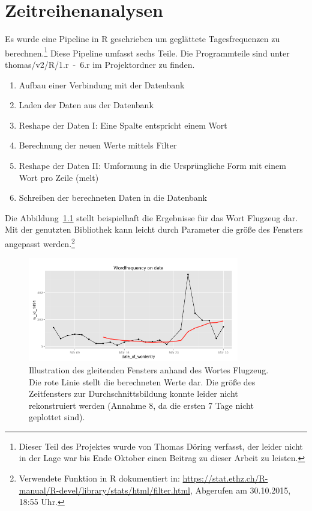 \chapter{Zeitreihenanalysen}
Es wurde eine Pipeline in R geschrieben um geglättete Tagesfrequenzen zu berechnen.\footnote{Dieser Teil des Projektes wurde von Thomas Döring verfasst, der leider nicht in der Lage war bis Ende Oktober einen Beitrag zu dieser Arbeit zu leisten.} Diese Pipeline umfasst sechs Teile. Die Programmteile sind unter thomas/v2/R/1.r~-~6.r im Projektordner zu finden.
\begin{enumerate}
\item Aufbau einer Verbindung mit der Datenbank
\item Laden der Daten aus der Datenbank
\item Reshape der Daten I: Eine Spalte entspricht einem Wort
\item Berechnung der neuen Werte mittels Filter
\item Reshape der Daten II: Umformung in die Ursprüngliche Form mit einem Wort pro Zeile (melt)
\item Schreiben der berechneten Daten in die Datenbank 
\end{enumerate}
Die Abbildung~\ref{pic.time_airplane} stellt beispielhaft die Ergebnisse für das Wort Flugzeug dar. Mit der genutzten Bibliothek kann leicht durch Parameter die größe des Fensters angepasst werden.\footnote{Verwendete Funktion in R dokumentiert in: \url{https://stat.ethz.ch/R-manual/R-devel/library/stats/html/filter.html}, Abgerufen am 30.10.2015, 18:55 Uhr.}
\begin{figure}[h!]
    \centering
    \includegraphics[width=0.82\textwidth]{pictures/timeFlugzeug.png}
    \caption{Illustration des gleitenden Fensters anhand des Wortes Flugzeug. Die rote Linie stellt die berechneten Werte dar. Die größe des Zeitfensters zur Durchschnittsbildung konnte leider nicht rekonstruiert werden (Annahme 8, da die ersten 7 Tage nicht geplottet sind). }\label{pic.time_airplane}
\end{figure}

